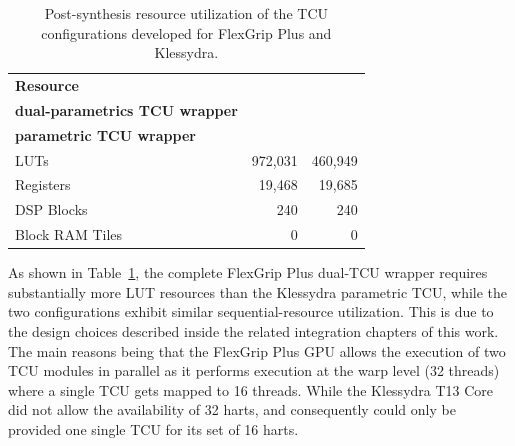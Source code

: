 \begin{table}[htbp]
    \centering
    \caption{Post-synthesis resource utilization of the TCU
    configurations developed for FlexGrip Plus and Klessydra.}
    \label{tab:tcu_area_comparison}

    \begin{tabular}{lrr}
        \toprule
        \textbf{Resource}
        & \shortstack{\textbf{FlexGrip Plus}\\
          \textbf{dual-parametrics TCU wrapper}}
        & \shortstack{\textbf{Klessydra}\\
          \textbf{parametric TCU wrapper}} \\
        \midrule

        LUTs
        & 972{,}031
        & 460{,}949 \\

        Registers
        & 19{,}468
        & 19{,}685 \\

        DSP Blocks
        & 240
        & 240 \\

        Block RAM Tiles
        & 0
        & 0 \\

        \bottomrule
    \end{tabular}
\end{table}

As shown in Table~\ref{tab:tcu_area_comparison}, the complete FlexGrip Plus dual-TCU wrapper requires substantially more LUT resources than the Klessydra parametric TCU, while the two configurations exhibit similar sequential-resource utilization. This is due to the design choices described inside the related integration chapters of this work. The main reasons being that the FlexGrip Plus GPU allows the execution of two TCU modules in parallel as it performs execution at the warp level (32 threads) where a single TCU gets mapped to 16 threads. While the Klessydra T13 Core did not allow the availability of 32 harts, and consequently could only be provided one single TCU for its set of 16 harts. 

